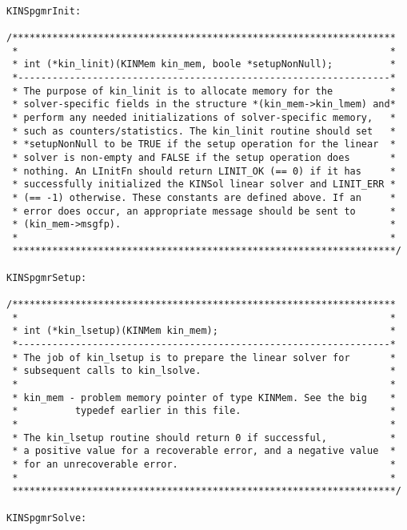 \begin{verbatim}

KINSpgmrInit:

/*******************************************************************
 *                                                                 *
 * int (*kin_linit)(KINMem kin_mem, boole *setupNonNull);          *
 *-----------------------------------------------------------------*
 * The purpose of kin_linit is to allocate memory for the          *
 * solver-specific fields in the structure *(kin_mem->kin_lmem) and*
 * perform any needed initializations of solver-specific memory,   *
 * such as counters/statistics. The kin_linit routine should set   *
 * *setupNonNull to be TRUE if the setup operation for the linear  *
 * solver is non-empty and FALSE if the setup operation does       *
 * nothing. An LInitFn should return LINIT_OK (== 0) if it has     *
 * successfully initialized the KINSol linear solver and LINIT_ERR *
 * (== -1) otherwise. These constants are defined above. If an     *
 * error does occur, an appropriate message should be sent to      *
 * (kin_mem->msgfp).                                               *
 *                                                                 *
 *******************************************************************/

KINSpgmrSetup:

/*******************************************************************
 *                                                                 *
 * int (*kin_lsetup)(KINMem kin_mem);                              *
 *-----------------------------------------------------------------*
 * The job of kin_lsetup is to prepare the linear solver for       *
 * subsequent calls to kin_lsolve.                                 *
 *                                                                 *
 * kin_mem - problem memory pointer of type KINMem. See the big    *
 *          typedef earlier in this file.                          *
 *                                                                 *
 * The kin_lsetup routine should return 0 if successful,           *
 * a positive value for a recoverable error, and a negative value  *
 * for an unrecoverable error.                                     *
 *                                                                 *
 *******************************************************************/

KINSpgmrSolve:


\end{verbatim}
